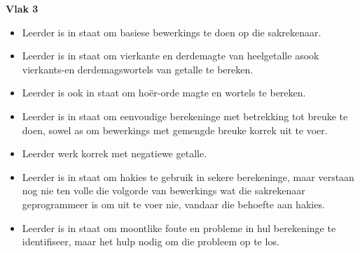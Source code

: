 \textbf{Vlak 3}\begin{itemize}[noitemsep]
\item
Leerder is in staat om basiese bewerkings te doen op die sakrekenaar.
\item
Leerder is in staat om vierkante en derdemagte van heelgetalle asook vierkants-en derdemagswortels van getalle te bereken.
\item
Leerder is ook in staat om hoër-orde magte en wortels te bereken.
\item
Leerder is in staat om eenvoudige berekeninge met betrekking tot breuke te doen, sowel as om bewerkings met gemengde breuke korrek uit te voer.
\item
Leerder werk korrek met negatiewe getalle.
\item
Leerder is in staat om hakies te gebruik in sekere berekeninge, maar verstaan nog nie ten volle die volgorde van bewerkings wat die sakrekenaar geprogrammeer is om uit te voer nie, vandaar die behoefte aan hakies.
\item
Leerder is in staat om moontlike foute en probleme in hul berekeninge
te identifiseer, maar het hulp nodig om die probleem op te los.
\end{itemize}
